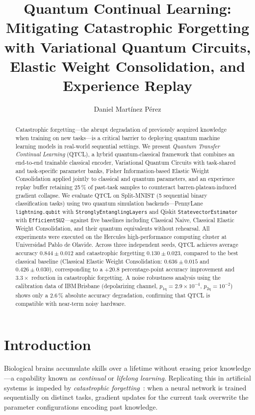 \documentclass[a4paper,nopdfoutputerror]{quantumarticle}
\title{Quantum Continual Learning: Mitigating Catastrophic Forgetting
with Variational Quantum Circuits, Elastic Weight Consolidation,
and Experience Replay}
\author{Daniel Mart\'inez P\'erez}
\affiliation{Quantum Machine Learning Group, Universidad Pablo de Olavide, Sevilla, Spain}
\begin{document}
\maketitle

\begin{abstract}
Catastrophic forgetting---the abrupt degradation of previously acquired
knowledge when training on new tasks---is a critical barrier to deploying
quantum machine learning models in real-world sequential settings.
We present \emph{Quantum Transfer Continual Learning} (QTCL), a hybrid
quantum-classical framework that combines an end-to-end trainable classical
encoder, Variational Quantum Circuits with task-shared and task-specific
parameter banks, Fisher Information-based Elastic Weight Consolidation
applied jointly to classical and quantum parameters, and an experience
replay buffer retaining 25\,\% of past-task samples to counteract
barren-plateau-induced gradient collapse.
We evaluate QTCL on Split-MNIST (5 sequential binary classification tasks)
using two quantum simulation backends---PennyLane \texttt{lightning.qubit}
with \texttt{StronglyEntanglingLayers} and Qiskit \texttt{StatevectorEstimator}
with \texttt{EfficientSU2}---against five baselines including Classical Naive,
Classical Elastic Weight Consolidation, and their quantum equivalents without
rehearsal.
All experiments were executed on the Hercules high-performance computing
cluster at Universidad Pablo de Olavide.
Across three independent seeds, QTCL achieves average accuracy
$0.844 \pm 0.012$ and catastrophic forgetting $0.130 \pm 0.023$,
compared to the best classical baseline (Classical Elastic Weight
Consolidation: $0.636 \pm 0.015$ and $0.426 \pm 0.030$), corresponding
to a $+20.8$ percentage-point accuracy improvement and $3.3\times$ reduction
in catastrophic forgetting.
A noise robustness analysis using the calibration data of IBM\,Brisbane
(depolarizing channel, $p_\mathrm{1q} = 2.9 \times 10^{-4}$, $p_\mathrm{2q} = 10^{-2}$)
shows only a 2.6\,\% absolute accuracy degradation, confirming that QTCL
is compatible with near-term noisy hardware.
\end{abstract}


\section{Introduction}
\label{sec:intro}

Biological brains accumulate skills over a lifetime without erasing prior
knowledge---a capability known as \emph{continual} or \emph{lifelong learning}.
Replicating this in artificial systems is impeded by \emph{catastrophic
forgetting}~\cite{mccloskey1989,goodfellow2013empirical}: when a neural
network is trained sequentially on distinct tasks, gradient updates for the
current task overwrite the parameter configurations encoding past knowledge.
\end{document}
